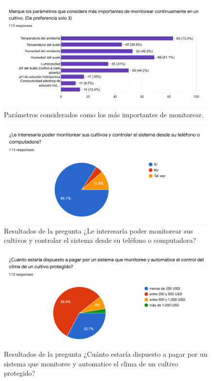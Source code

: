 \begin{figure}[!h]
	\centering
	\includegraphics[width=1\linewidth]{imagenes/encuesta/pregunta_6.png}
	\caption{Parámetros considerados como los más importantes de monitorear.}
	\label{fig:pregunta_6_parametros}
\end{figure}

\begin{figure}[!h]
	\centering
	\includegraphics[width=1\linewidth]{imagenes/encuesta/pregunta_7.png}
	\caption{Resultados de la pregunta ¿Le interesaría poder monitorear sus cultivos y controlar el sistema desde su teléfono o computadora?}
	\label{fig:pregunta_7_quiere_monitorear_remoto}
\end{figure}

\begin{figure}[!h]
	\centering
	\includegraphics[width=1\linewidth]{imagenes/encuesta/pregunta_8.png}
	\caption{Resultados de la pregunta ¿Cuánto estaría dispuesto a pagar por un sistema que monitoree y automatice el clima de un cultivo protegido?}
	\label{fig:pregunta_8_cuanto_pagaria}
\end{figure}
